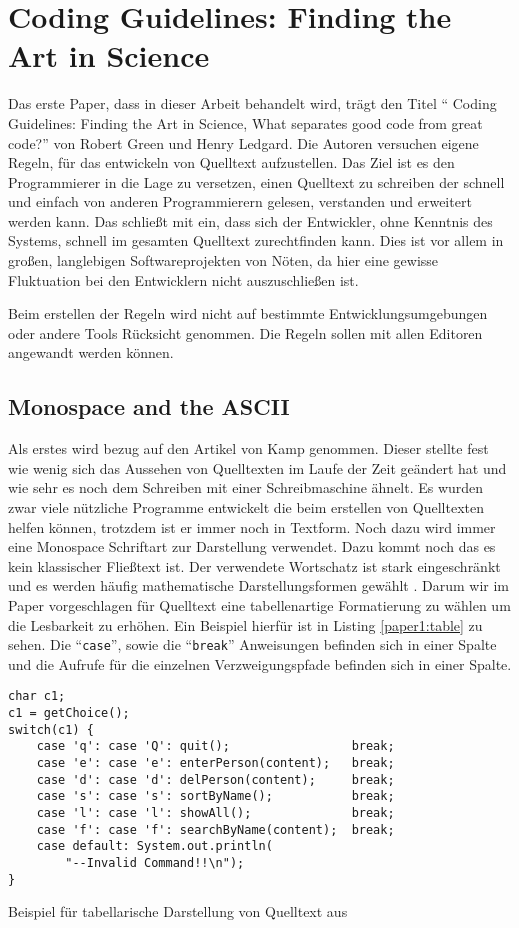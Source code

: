 
\section{Coding Guidelines: Finding the Art in Science}
Das erste Paper, dass in dieser Arbeit behandelt wird, trägt den Titel \enquote{ Coding Guidelines: Finding the Art in Science, What separates good code from great code?} von Robert Green und Henry Ledgard\cite{Green}. Die Autoren versuchen eigene Regeln, für das entwickeln von Quelltext aufzustellen. Das Ziel ist es den Programmierer in die Lage zu versetzen, einen Quelltext zu schreiben der schnell und einfach von anderen Programmierern gelesen, verstanden und erweitert werden kann. Das schließt mit ein, dass sich der Entwickler, ohne Kenntnis des Systems, schnell im gesamten Quelltext zurechtfinden kann. Dies ist vor allem in großen, langlebigen Softwareprojekten von Nöten, da hier eine gewisse Fluktuation bei den Entwicklern nicht auszuschließen ist\cite[S. 12]{Green}.

Beim erstellen der Regeln wird nicht auf bestimmte Entwicklungsumgebungen oder andere Tools Rücksicht genommen. Die Regeln sollen mit allen Editoren angewandt werden können.
\subsection{Monospace and the ASCII}
Als erstes wird bezug auf den Artikel von Kamp\cite{Kamp} genommen. Dieser stellte fest wie wenig sich das Aussehen von Quelltexten im Laufe der Zeit geändert hat und wie sehr es noch dem Schreiben mit einer Schreibmaschine ähnelt. Es wurden zwar viele nützliche Programme entwickelt die beim erstellen von Quelltexten helfen können, trotzdem ist er immer noch in Textform. Noch dazu wird immer eine Monospace Schriftart zur Darstellung verwendet. Dazu kommt noch das es kein klassischer Fließtext ist. Der verwendete Wortschatz ist stark eingeschränkt und es werden häufig mathematische Darstellungsformen gewählt \cite[S. 2]{Green}. Darum wir im Paper\cite{Green} vorgeschlagen für Quelltext eine tabellenartige Formatierung zu wählen um die Lesbarkeit zu erhöhen. Ein Beispiel hierfür ist in Listing \ref{paper1:table} zu sehen. Die \enquote{\texttt{case}}, sowie die \enquote{\texttt{break}} Anweisungen befinden sich in einer Spalte und die Aufrufe für die einzelnen Verzweigungspfade befinden sich in einer Spalte.

\begin{listing}[H]
    \begin{verbatim}
char c1;
c1 = getChoice();
switch(c1) {
    case 'q': case 'Q': quit();                 break;
    case 'e': case 'e': enterPerson(content);   break;
    case 'd': case 'd': delPerson(content);     break;
    case 's': case 's': sortByName();           break;
    case 'l': case 'l': showAll();              break;
    case 'f': case 'f': searchByName(content);  break;
    case default: System.out.println(
        "--Invalid Command!!\n");
}
    \end{verbatim}
    \caption{Beispiel für tabellarische Darstellung von Quelltext aus \cite[S. 2]{Green}}
    \label{paper1:table}
\end{listing}

